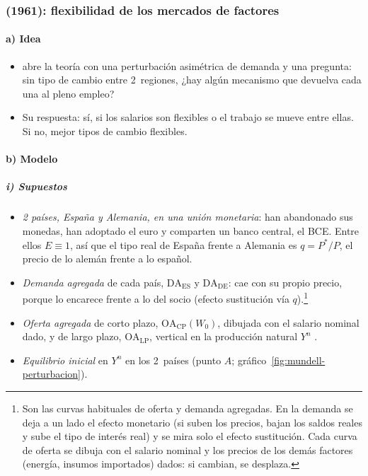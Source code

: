 \documentclass[11pt]{article}
\begin{document}
\subsubsection{ (1961): flexibilidad de los mercados de factores}\label{sec:mundell}

\paragraph{a) Idea}

\begin{itemize}
\item \textcite{Mundell1961Theory} abre la teoría con una perturbación asimétrica de demanda y una pregunta: sin tipo de cambio entre 2~regiones, ¿hay algún mecanismo que devuelva cada una al pleno empleo?
\item Su respuesta: sí, si los salarios son flexibles o el trabajo se mueve entre ellas. Si no, mejor tipos de cambio flexibles.
\end{itemize}

\paragraph{b) Modelo}

\subparagraph{i) Supuestos}

\begin{itemize}
\item \emph{2 países, España y Alemania, en una unión monetaria}: han abandonado sus monedas, han adoptado el euro y comparten un banco central, el BCE. Entre ellos $E\equiv 1$, así que el tipo real de España frente a Alemania es $q=P^*/P$, el precio de lo alemán frente a lo español.
\item \emph{Demanda agregada} de cada país, $\mathrm{DA}_{\mathrm{ES}}$ y $\mathrm{DA}_{\mathrm{DE}}$: cae con su propio precio, porque lo encarece frente a lo del socio (efecto sustitución vía $q$).\footnote{Son las curvas habituales de oferta y demanda agregadas\nocite{BaldwinWyplosz2020Economics}. En la demanda se deja a un lado el efecto monetario (si suben los precios, bajan los saldos reales y sube el tipo de interés real) y se mira solo el efecto sustitución. Cada curva de oferta se dibuja con el salario nominal y los precios de los demás factores (energía, insumos importados) dados: si cambian, se desplaza.}
\item \emph{Oferta agregada} de corto plazo, $\mathrm{OA}_{\mathrm{CP}}(W_0)$, dibujada con el salario nominal dado, y de largo plazo, $\mathrm{OA}_{\mathrm{LP}}$, vertical en la producción natural $Y^n$ .
\item \emph{Equilibrio inicial} en $Y^n$ en los 2~países (punto $A$; gráfico~\ref{fig:mundell-perturbacion}).
\end{itemize}
\end{document}
